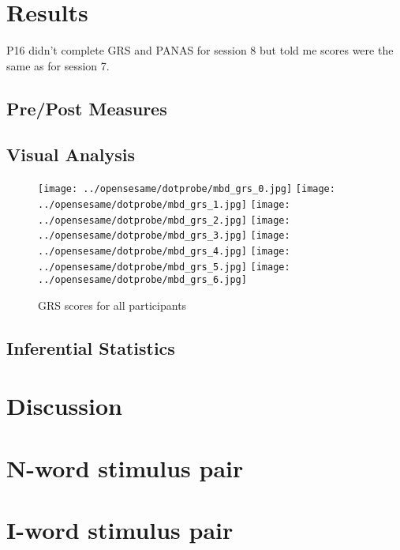 \documentclass[man,floatsintext,a4paper,biblatex]{apa6}
\begin{document}
\section{Results}
P16 didn't complete GRS and PANAS for session 8 but told me scores were the same as for session 7.
\subsection{Pre/Post Measures}
\subsection{Visual Analysis}
\begin{figure}[p]
\texttt{[image: ../opensesame/dotprobe/mbd\_grs\_0.jpg]}
\texttt{[image: ../opensesame/dotprobe/mbd\_grs\_1.jpg]}
\texttt{[image: ../opensesame/dotprobe/mbd\_grs\_2.jpg]}
\texttt{[image: ../opensesame/dotprobe/mbd\_grs\_3.jpg]}
\texttt{[image: ../opensesame/dotprobe/mbd\_grs\_4.jpg]}
\texttt{[image: ../opensesame/dotprobe/mbd\_grs\_5.jpg]}
\texttt{[image: ../opensesame/dotprobe/mbd\_grs\_6.jpg]}
\caption{GRS scores for all participants\label{overflow}}
\end{figure}

\subsection{Inferential Statistics}

\section{Discussion}

\printbibliography
\appendix
\section{N-word stimulus pair}
\section{I-word stimulus pair}
\end{document}
